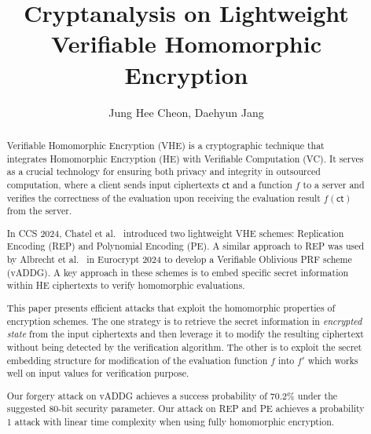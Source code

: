 \documentclass[runningheads]{llncs}
\newcommand{\ct}{\textsf{ct}{}}
\newcommand{\REP}{\textsf{REP}{}}
\newcommand{\PE}{\textsf{PE}{}}
\begin{document}
\title{Cryptanalysis on Lightweight Verifiable Homomorphic Encryption}

\author{Jung Hee Cheon, Daehyun Jang}


\maketitle  %

\begin{abstract}{
    Verifiable Homomorphic Encryption (VHE) is a cryptographic technique that integrates Homomorphic Encryption (HE) with Verifiable Computation (VC). It serves as a crucial technology for ensuring both privacy and integrity in outsourced computation, where a client sends input ciphertexts $\ct$ and a function $f$ to a server and verifies the correctness of the evaluation upon receiving the evaluation result $f(\ct)$ from the server.
        
    In CCS 2024, Chatel et al.~\cite{VE} introduced two lightweight VHE schemes: Replication Encoding (\REP) and Polynomial Encoding (\PE). A similar approach to \REP{} was used by Albrecht et al.~\cite{cryptoeprint:PRF} in Eurocrypt 2024 to develop a Verifiable Oblivious PRF scheme (vADDG).   
    A key approach in these schemes is to embed specific secret information within HE ciphertexts to verify homomorphic evaluations.
    
    This paper presents efficient attacks that exploit the homomorphic properties of encryption schemes. The one strategy is to retrieve the secret information in \emph{encrypted state} from the input ciphertexts and then leverage it to modify the resulting ciphertext without being detected by the verification algorithm. The other is to exploit the secret embedding structure for modification of the evaluation function $f$ into $f'$ which works well on input values for verification purpose.
     
     Our forgery attack on vADDG achieves a success probability of 70.2\% under the suggested 80-bit security parameter. Our attack on \REP{} and \PE{} achieves a probability 1 attack with linear time complexity when using fully homomorphic encryption.
    
    }
\end{abstract}
\end{document}
